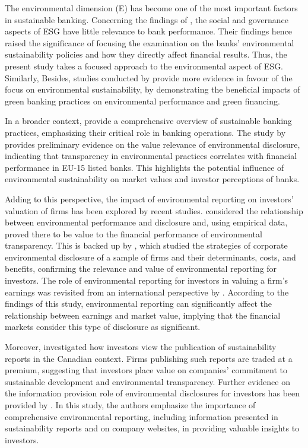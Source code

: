 \documentclass[11pt, a4paper]{article}
\begin{document}
The environmental dimension (E) has become one of the most important factors in sustainable banking. Concerning the findings of \cite{Azmi2021}, the social and governance aspects of ESG have little relevance to bank performance. Their findings hence raised the significance of focusing the examination on the banks' environmental sustainability policies and how they directly affect financial results. Thus, the present study takes a focused approach to the environmental aspect of ESG. Similarly, Besides, studies conducted by \cite{Chen2022} provide more evidence in favour of the focus on environmental sustainability, by demonstrating the beneficial impacts of green banking practices on environmental performance and green financing.

In a broader context, \cite{Inacio2022} provide a comprehensive overview of sustainable banking practices, emphasizing their critical role in banking operations. The study by \cite{Care2019} provides preliminary evidence on the value relevance of environmental disclosure, indicating that transparency in environmental practices correlates with financial performance in EU-15 listed banks. This highlights the potential influence of environmental sustainability on market values and investor perceptions of banks.

Adding to this perspective, the impact of environmental reporting on investors' valuation of firms has been explored by recent studies. \cite{Clarkson2008} considered the relationship between environmental performance and disclosure and, using empirical data, proved there to be value to the financial performance of environmental transparency. This is backed up by \cite{Cormier1999}, which studied the strategies of corporate environmental disclosure of a sample of firms and their determinants, costs, and benefits, confirming the relevance and value of environmental reporting for investors. The role of environmental reporting for investors in valuing a firm's earnings was revisited from an international perspective by \cite{Cormier2007}. According to the findings of this study, environmental reporting can significantly affect the relationship between earnings and market value, implying that the financial markets consider this type of disclosure as significant.

Moreover, \cite{Berthelot2012} investigated how investors view the publication of sustainability reports in the Canadian context. Firms publishing such reports are traded at a premium, suggesting that investors place value on companies' commitment to sustainable development and environmental transparency. Further evidence on the information provision role of environmental disclosures for investors has been provided by \cite{Cormier2011}. In this study, the authors emphasize the importance of comprehensive environmental reporting, including information presented in sustainability reports and on company websites, in providing valuable insights to investors.
\end{document}
